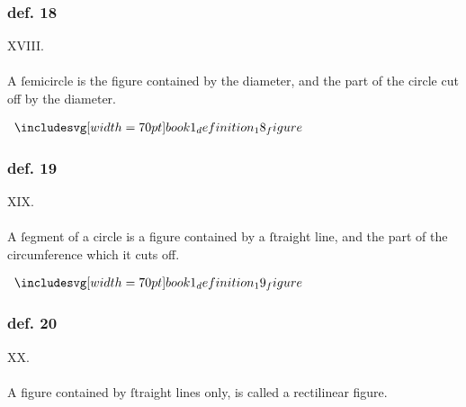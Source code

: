 \hfill

\begin{minipage}{0.67\textwidth}
    \subsubsection{def. 18}
    \begin{center}
        XVIII.\label{book1def18}\\
        \hfill\\
        A ſemicircle is the figure contained by the diameter, and the part of the circle cut off by the diameter.
    \end{center}
\end{minipage}%
\begin{minipage}{0.33\textwidth}
    \begin{center}
        $\img[0][0][70]{book1_definition_18_figure}$
    \end{center}
\end{minipage}

\hfill

\begin{minipage}{0.67\textwidth}
    \subsubsection{def. 19}
    \begin{center}
        XIX.\label{book1def19}\\
        \hfill\\
        A ſegment of a circle is a figure contained by a ſtraight line, and the part of the circumference which it cuts off.
    \end{center}
\end{minipage}%
\begin{minipage}{0.33\textwidth}
    \begin{center}
        $\img[0][0][70]{book1_definition_19_figure}$
    \end{center}
\end{minipage}

\hfill

\begin{minipage}{0.67\textwidth}
    \subsubsection{def. 20}
    \begin{center}
        XX.\label{book1def20}\\
        \hfill\\
        A figure contained by ſtraight lines only, is called a rectilinear figure.\\
    \end{center}
\end{minipage}

